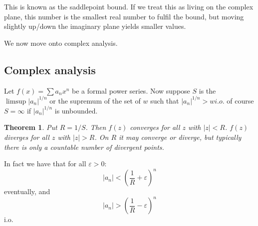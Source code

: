 \documentclass[]{article}
\newtheorem{theorem}{Theorem}
\theoremstyle{definition}
\numberwithin{theorem}{section}
\numberwithin{equation}{section}
\begin{document}
This is known as the saddlepoint bound. If we treat this as living on the complex plane, this number is the smallest real number to fulfil the bound, but moving slightly up/down the imaginary plane yields smaller values. 

We now move onto complex analysis.

\subsection{Complex analysis}
Let $f(x) = \sum a_n x^n$ be a formal power series. Now suppose $S$ is the $\limsup |a_n|^{1/n}$ or the supremum of the set of $w$ such that $|a_n|^{1/n} > w i.o$. 
of course $S = \infty$ if $|a_n|^{1/n}$ is unbounded.

\begin{theorem}
	Put $R = 1/S$. Then $f(z)$ converges for all $z$ with $|z| < R$. $f(z)$ diverges for all $z$ with $|z| > R$. On $R$ it may converge or diverge, but typically there is only a countable number of divergent points. 
\end{theorem}
In fact we have that for all $\varepsilon > 0$:
\begin{equation}
	|a_n | < (\frac{1}{R} + \varepsilon)^n 
\end{equation}
eventually, and 
\begin{equation}
	|a_n | > (\frac{1}{R} - \varepsilon)^n 
\end{equation}
i.o.
\end{document}
